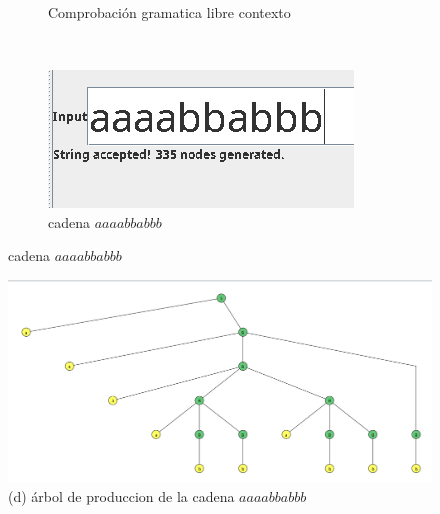 \documentclass{article}
\begin{document}
\begin{figure}[h]
\begin{subfigure}[b]{0.55\textwidth}
                    \caption{Comprobación gramatica libre contexto}
                    \label{fig:label2}
                \end{subfigure}
                \vspace{0.5cm} 
                \\
                \begin{subfigure}[b]{0.35\textwidth}
                    \centering
                    \includegraphics[width=\textwidth]{./Imagenes/image3.png}
                    \caption{cadena $aaaabbabbb$}
                    \label{fig:label3}
                \end{subfigure}
                \label{fig:matrix1}
            \end{figure}

            \begin{figure}[!h]
                \centering
                \includegraphics[width=\textwidth]{./Imagenes/image4.png}
                \caption*{(d) árbol de produccion de la cadena $aaaabbabbb$}
                \label{fig:label4}
            \end{figure}
                
        \newpage

\end{document}
